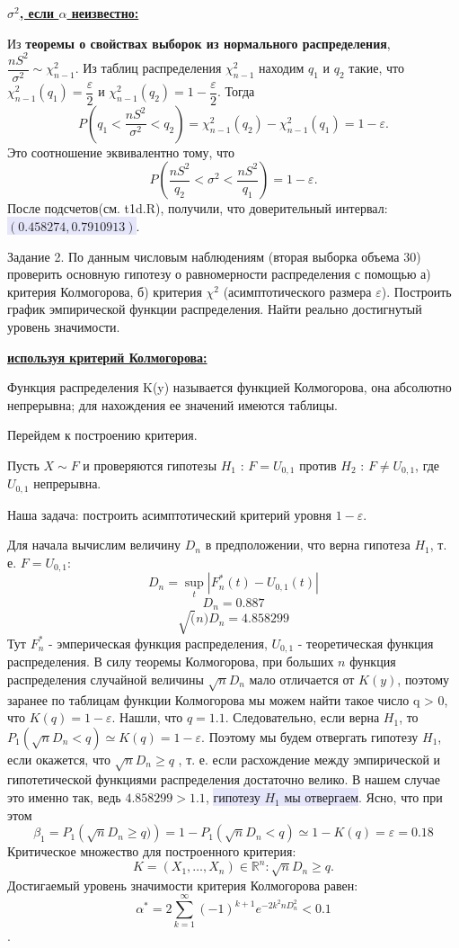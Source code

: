 \documentclass{article}
\begin{document}
\underline{\bf $\sigma^2$, если $\alpha$ неизвестно:}

Из {\bf теоремы о свойствах выборок из нормального распределения}, 
$\dfrac{n S^2}{\sigma^2} \sim \chi_{n - 1}^2$. 
Из таблиц распределения $\chi_{n - 1}^2$ находим $q_1$ и $q_2$ такие, что $\chi_{n - 1}^2(q_1) = \dfrac{\varepsilon}{2}$ и $\chi_{n - 1}^2(q_2) = 1 - \dfrac{\varepsilon}{2}$.
Тогда 
\[P \left(q_1 < \dfrac{n S^2}{\sigma^2} < q_2 \right) = \chi_{n - 1}^2(q_2) - \chi_{n - 1}^2(q_1) = 1 - \varepsilon.\]
Это соотношение эквивалентно тому, что
\[P \left(\dfrac{n S^2}{q_2} < \sigma^2 < \dfrac{n S^2}{q_1}\right) = 1 - \varepsilon.\]
После подсчетов(см. t1d.R), получили, что доверительный интервал: 
\colorbox{Lavender}{$(0.458274, 0.7910913)$}.

\colorbox{light-gray}{Задание 2.}
По данным числовым наблюдениям (вторая выборка объема $30$) проверить основную гипотезу о равномерности распределения с помощью а) критерия Колмогорова, б) критерия $\chi^2$ (асимптотического размера $\varepsilon$). Построить график эмпирической функции распределения. Найти реально достигнутый уровень значимости.

\underline{\bf используя критерий Колмогорова:}

Функция распределения K(y) называется функцией Колмогорова, она абсолютно непрерывна; 
для нахождения ее значений имеются таблицы.

Перейдем к построению критерия.

Пусть $X \sim F$ и проверяются гипотезы $H_1$ : $F = U_{0, 1}$ против $H_2$ : $F \neq U_{0, 1}$, где $U_{0, 1}$ непрерывна. 

Наша задача: построить асимптотический критерий уровня $1 - \varepsilon$.

Для начала вычислим величину $D_n$ в предположении, что верна гипотеза $H_1$, т. е.
$F = U_{0, 1}$:
\[D_n = \sup_{t} |F_n^*(t)-U_{0,1}(t)|\]
\[D_n = 0.887\]
\[\sqrt(n) D_n = 4.858299\]
Тут $F_n^*$ - эмперическая функция распределения, $U_{0,1}$ - теоретическая функция распределения. В силу теоремы Колмогорова, при больших $n$ функция распределения случайной
величины $\sqrt{n}D_n$ мало отличается от $K(y)$, поэтому заранее по таблицам функции
Колмогорова мы можем найти такое число q > 0, что $K(q) = 1 - \varepsilon$. Нашли, что $q = 1.1$.
Следовательно, если верна $H_1$, то $P_1 \left(\sqrt{n} D_n < q \right) \simeq K(q) = 1 - \varepsilon$. 
Поэтому мы будем отвергать гипотезу $H_1$, если окажется, что $\sqrt{n} D_n \geqslant q$ ,
т. е. если расхождение между эмпирической и гипотетической функциями распределения достаточно велико. В нашем случае это именно так, ведь $4.858299 > 1.1$, \colorbox{Lavender}{гипотезу $H_1$ мы отвергаем}. 
Ясно, что при этом
\[\beta_1 = P_1 \left( \sqrt{n} D_n \geqslant q)\right) = 1 - P_1 \left(\sqrt{n} D_n < q\right) \simeq 1 - K(q) = \varepsilon = 0.18\] 
Критическое множество для построенного критерия: 
\[K = {(X_1, \dots, X_n) \in \mathbb{R}^n : \sqrt{n}D_n \geqslant q}. \]
Достигаемый уровень значимости критерия Колмогорова равен:
\[\alpha^* = 2 \sum_{k = 1}^\infty (-1)^{k+1} e^{-2k^2 n D_n^2} < 0.1\].
\end{document}
